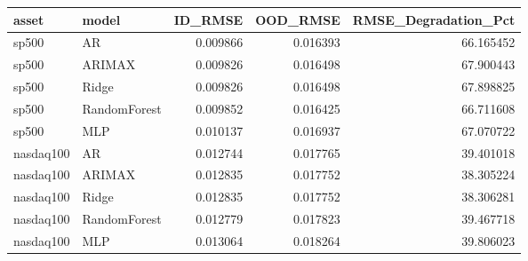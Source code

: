 \begin{tabular}{llrrr}
\toprule
asset & model & ID_RMSE & OOD_RMSE & RMSE_Degradation_Pct \\
\midrule
sp500 & AR & 0.009866 & 0.016393 & 66.165452 \\
sp500 & ARIMAX & 0.009826 & 0.016498 & 67.900443 \\
sp500 & Ridge & 0.009826 & 0.016498 & 67.898825 \\
sp500 & RandomForest & 0.009852 & 0.016425 & 66.711608 \\
sp500 & MLP & 0.010137 & 0.016937 & 67.070722 \\
nasdaq100 & AR & 0.012744 & 0.017765 & 39.401018 \\
nasdaq100 & ARIMAX & 0.012835 & 0.017752 & 38.305224 \\
nasdaq100 & Ridge & 0.012835 & 0.017752 & 38.306281 \\
nasdaq100 & RandomForest & 0.012779 & 0.017823 & 39.467718 \\
nasdaq100 & MLP & 0.013064 & 0.018264 & 39.806023 \\
\bottomrule
\end{tabular}
